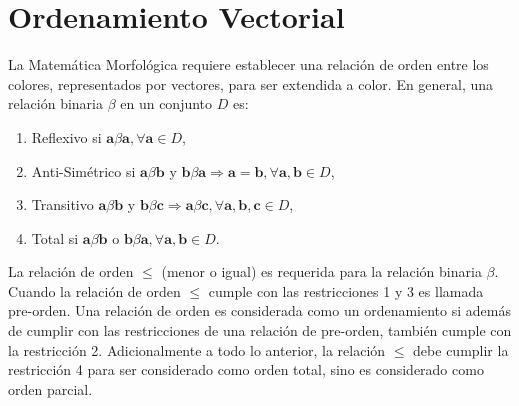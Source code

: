 \section{Ordenamiento Vectorial}
La Matemática Morfológica requiere establecer una relación de orden entre los colores, representados por vectores, para ser extendida a color. 
En general, una relación binaria $\beta$ en un conjunto $D$ es:
\begin{enumerate}
\item Reflexivo si $\boldsymbol a \beta \boldsymbol a, \forall \boldsymbol a \in D$,
\item Anti-Simétrico si $\boldsymbol a \beta \boldsymbol b$ y  $\boldsymbol b \beta \boldsymbol a \Rightarrow \boldsymbol a = \boldsymbol b, \forall \boldsymbol a, \boldsymbol b \in  D$,
\item Transitivo $\boldsymbol a \beta \boldsymbol b$ y $\boldsymbol b \beta \boldsymbol c \Rightarrow \boldsymbol a \beta \boldsymbol c, \forall  \boldsymbol a, \boldsymbol b, \boldsymbol c \in D$,
\item Total si $\boldsymbol a \beta \boldsymbol b$ o $\boldsymbol b \beta \boldsymbol a, \forall \boldsymbol a, \boldsymbol b \in D$.
\end{enumerate}

La relación de orden $\leq$ (menor o igual) es requerida para la relación binaria $\beta$.
Cuando la relación de orden $\leq$ cumple con las restricciones 1 y 3 es llamada pre-orden. Una relación de orden es considerada como un ordenamiento si además de cumplir con las restricciones de una relación de pre-orden, también cumple con la restricción 2.
Adicionalmente a todo lo anterior, la relación $\leq$ debe cumplir la restricción 4 para ser considerado como orden total, sino es considerado como orden parcial.

